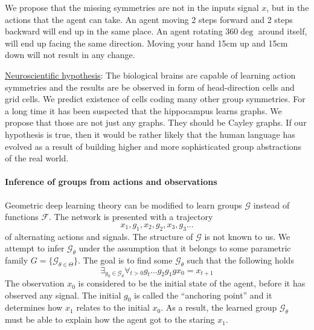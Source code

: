 \documentclass[12pt]{article}
\begin{document}
We propose that the missing symmetries are not in the inputs signal $x$, but in the actions that the agent can take. An agent moving 2 steps forward and 2 steps backward will end up in the same place. An agent rotating $360\deg$ around itself, will end up facing the same direction. Moving your hand 15cm up and 15cm down will not result in any change. 

\underline{Neuroscientific hypothesis}: The biological brains are capable of learning action symmetries and the results are be observed in form of head-direction cells and grid cells. We predict existence of cells coding many other group symmetries. For a long time it has been suspected that the hippocampus learns graphs. We propose that those are not just any graphs. They should be Cayley graphs. If our hypothesis is true, then it would be rather likely that the human language has evolved as a result of building higher and more sophisticated group abstractions of the real world. 

\paragraph{Inference of groups from actions and observations}

Geometric deep learning theory can be modified to learn groups $\mathcal{G}$ instead of functions $\mathcal{F}$. The network is presented with a trajectory \[x_1,g_1,x_2,g_2,x_3,g_3...\] 
of alternating actions and signals. The structure of $\mathcal{G}$ is not known to us. We attempt to infer  $\mathcal{G}_\theta$ under the assumption that  it belongs to some parametric family $G=\{\mathcal{G}_{\theta\in\Theta}\}$. The goal is to find some $\mathcal{G}_\theta$ such that the following holds 
\[
\exists_{ g_0\in\mathcal{G}_\theta} \forall_{t>0} g_t...g_2g_1gx_0 = x_{t+1}
\] The observation $x_0$ is considered to be the initial state of the agent, before it has observed any signal. The initial $g_0$ is called the ``anchoring point'' and it determines how $x_1$ relates to the initial $x_0$. As a result, the learned group $\mathcal{G}_\theta$ must be able to explain how the agent got to the staring $x_1$. 
\end{document}
